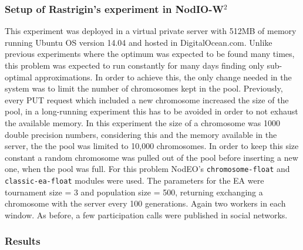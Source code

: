 \documentclass[journal,onecolumn]{IEEEtran}
\begin{document}
\subsubsection{Setup of Rastrigin's experiment in {\sf NodIO}-W$^2$ }
This experiment was deployed in a virtual private server with 512MB of memory
running Ubuntu OS version 14.04 and hosted in DigitalOcean.com. Unlike previous
experiments where the optimum was expected to be found many times, 
this problem was expected to run constantly for many days finding only
sub-optimal approximations. In order to achieve this, the only change needed 
in the system was to limit the number of chromosomes kept in the pool. 
Previously, every PUT request which included a new chromosome increased 
the size of the pool, in a long-running experiment this has to be avoided
in order to not exhaust the available memory. In this experiment the size
of a chromosome was 1000 double precision numbers, considering this
and the memory available in the server, the the pool was limited 
to 10,000 chromosomes.  In order to keep this size
constant a random chromosome was pulled out of the pool before inserting a
new one, when the pool was full. For this problem {\sf NodEO}'s {\tt chromosome-float} 
and {\tt classic-ea-float} modules were used. The parameters for the EA 
were tournament size = 3 and  population size = 500, returning exchanging a
chromosome with the server every 100 generations. Again two workers in each window.
As before, a few participation calls were published in social networks.

\subsubsection{Results}
\end{document}
